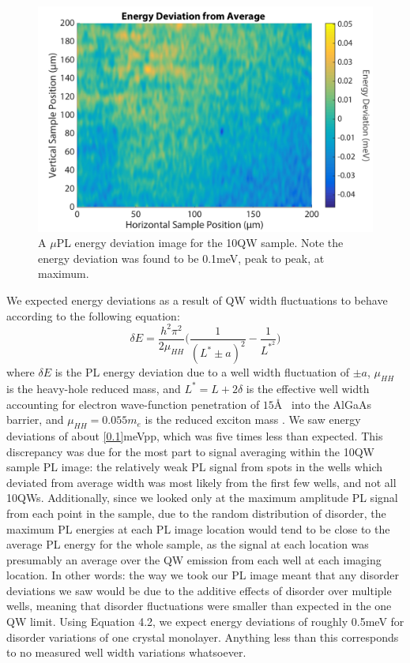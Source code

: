 \begin{figure}[h!]
\centering
\includegraphics[width = .8\textwidth]{10QW_devplot.png}
\caption{ \doublespacing A $\mu$PL energy deviation image for the 10QW sample. Note the energy deviation was found to be 0.1meV, peak to peak, at maximum.}
\label{devmap10QW}
\end{figure}

\newpage
\indent We expected energy deviations as a result of QW width fluctuations to behave according to the following equation:
\begin{equation}
\label{de}
\delta E = \frac{h^2 \pi^2}{2 \mu_{HH}}\Big ( \frac{1}{(L^* \pm a)^2}- \frac{1}{L^{*^2}} \Big )
\end{equation}
where $\delta E$ is the PL energy deviation due to a well width fluctuation of $\pm a$, $\mu_{HH}$ is the heavy-hole reduced mass, and $L^* = L+2\delta$ is the effective well width accounting for electron wave-function penetration of $15$\AA ~ into the AlGaAs barrier, and $\mu_{HH} = 0.055m_e$ is the reduced exciton mass \cite{glinka, santos}. We saw energy deviations of about \ref{0.1}meVpp, which was five times less than expected. This discrepancy was due for the most part to signal averaging within the 10QW sample PL image: the relatively weak PL signal from spots in the wells which deviated from average width was most likely from the first few wells, and not all 10QWs. Additionally, since we looked only at the maximum amplitude PL signal from each point in the sample, due to the random distribution of disorder, the maximum PL energies at each PL image location would tend to be close to the average PL energy for the whole sample, as the signal at each location was presumably an average over the QW emission from each well at each imaging location. In other words: the way we took our PL image meant that any disorder deviations we saw would be due to the additive effects of disorder over multiple wells, meaning that disorder fluctuations were smaller than expected in the one QW limit. Using Equation 4.2, we expect energy deviations of roughly 0.5meV for disorder variations of one crystal monolayer. Anything less than this corresponds to no measured well width variations whatsoever.



